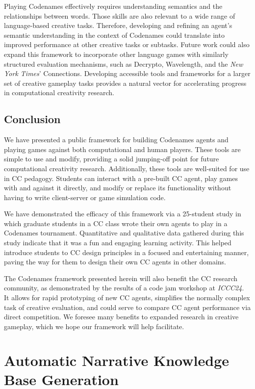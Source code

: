 \documentclass[phd,electronic,oneside,twosidetoc,letterpaper,chaptercenter,parttop,lof]{byumsphd}
\begin{document}
Playing Codenames effectively requires understanding semantics and the relationships between words. Those skills are also relevant to a wide range of language-based creative tasks. Therefore, developing and refining an agent's semantic understanding in the context of Codenames could translate into improved performance at other creative tasks or subtasks. Future work could also expand this framework to incorporate other language games with similarly structured evaluation mechanisms, such as Decrypto, Wavelength, and the \emph{New York Times}' Connections. Developing accessible tools and frameworks for a larger set of creative gameplay tasks provides a natural vector for accelerating progress in computational creativity research.

\section{Conclusion}
We have presented a public framework for building Codenames agents and playing games against both computational and human players. These tools are simple to use and modify, providing a solid jumping-off point for future computational creativity research. Additionally, these tools are well-suited for use in CC pedagogy. Students can interact with a pre-built CC agent, play games with and against it directly, and modify or replace its functionality without having to write client-server or game simulation code.

We have demonstrated the efficacy of this framework via a 25-student study in which graduate students in a CC class wrote their own agents to play in a Codenames tournament. Quantitative and qualitative data gathered during this study indicate that it was a fun and engaging learning activity. This helped introduce students to CC design principles in a focused and entertaining manner, paving the way for them to design their own CC agents in other domains.

The Codenames framework presented herein will also benefit the CC research community, as demonstrated by the results of a code jam workshop at \emph{ICCC24}. It allows for rapid prototyping of new CC agents, simplifies the normally complex task of creative evaluation, and could serve to compare CC agent performance via direct competition. We foresee many benefits to expanded research in creative gameplay, which we hope our framework will help facilitate.

\chapter{Automatic Narrative Knowledge Base Generation}
\label{chap:llmexica}
\end{document}
